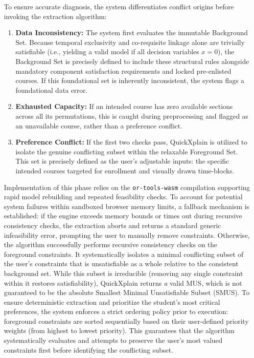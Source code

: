 \documentclass{icsthesis}
\begin{document}
\begin{mainmatter}
		To ensure accurate diagnosis, the system differentiates conflict origins before invoking the extraction algorithm:\\
		\begin{enumerate}
			\item \textbf{Data Inconsistency:} The system first evaluates the immutable Background Set. Because temporal exclusivity and co-requisite linkage alone are trivially satisfiable (i.e., yielding a valid model if all decision variables $x=0$), the Background Set is precisely defined to include these structural rules alongside mandatory component satisfaction requirements and locked pre-enlisted courses. If this foundational set is inherently inconsistent, the system flags a foundational data error.
			\item \textbf{Exhausted Capacity:} If an intended course has zero available sections across all its permutations, this is caught during preprocessing and flagged as an unavailable course, rather than a preference conflict.
			\item \textbf{Preference Conflict:} If the first two checks pass, QuickXplain is utilized to isolate the genuine conflicting subset within the relaxable Foreground Set. This set is precisely defined as the user's adjustable inputs: the specific intended courses targeted for enrollment and visually drawn time-blocks.
		\end{enumerate}
		
		Implementation of this phase relies on the \texttt{or-tools-wasm} compilation supporting rapid model rebuilding and repeated feasibility checks. To account for potential system failures within sandboxed browser memory limits, a fallback mechanism is established: if the engine exceeds memory bounds or times out during recursive consistency checks, the extraction aborts and returns a standard generic infeasibility error, prompting the user to manually remove constraints. Otherwise, the algorithm successfully performs recursive consistency checks on the foreground constraints. It systematically isolates a minimal conflicting subset of the user's constraints that is unsatisfiable as a whole relative to the consistent background set. While this subset is irreducible (removing any single constraint within it restores satisfiability), QuickXplain returns \textit{a} valid MUS, which is not guaranteed to be the absolute Smallest Minimal Unsatisfiable Subset (SMUS). To ensure deterministic extraction and prioritize the student's most critical preferences, the system enforces a strict ordering policy prior to execution: foreground constraints are sorted sequentially based on their user-defined priority weights (from highest to lowest priority). This guarantees that the algorithm systematically evaluates and attempts to preserve the user's most valued constraints first before identifying the conflicting subset.
		

\end{mainmatter}
\end{document}
